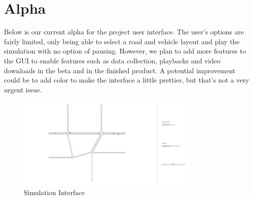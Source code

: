 \documentclass[onecolumn, draftclsnofoot,10pt, compsoc]{IEEEtran}
\begin{document}
\section{Alpha}
Below is our current alpha for the project user interface. The user’s options are fairly limited, only being able to select a road and vehicle layout and play the simulation with no option of pausing. However, we plan to add more features to the GUI to enable features such as data collection, playbacks and video downloads in the beta and in the finished product. A potential improvement could be to add color to make the interface a little prettier, but that’s not a very urgent issue.
\begin{figure}[H]
\caption{Simulation Interface}
\includegraphics[width=3.5in]{gui}
\end{figure}
\end{document}
